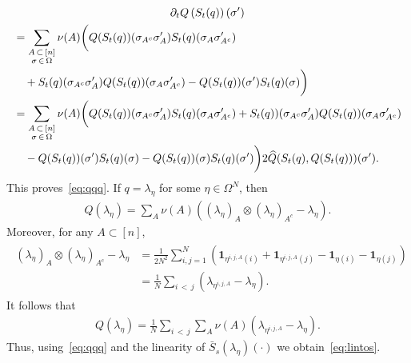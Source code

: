 \documentclass[AHL,Unicode,longabstracts,published]{cedram}
\newcommand{\Om}{\Omega}
\newcommand{\ind}{\mathbf{1}}
\let\l=\lambda
\let\O=\Omega
\let\oldhat\hat
\renewcommand*{\hat}[1]{\mathchoice{\widehat{#1}}{\widehat{#1}}{\oldhat{#1}}{\oldhat{#1}}}
\begin{document}
\begin{multline*}
\partial_t Q\left(S_t(q)\right)(\sigma')\\
\begin{aligned}
& = \sum_{\substack{A\,\subset\,[n]\\
\sigma\, \in\,\Om}}\nu(A)\bigg(Q(S_t(q))(\sigma_{A^c} \sigma'_{A}) S_t(q)(\sigma_A \sigma'_{A^c}) \\
&\quad +S_t(q)(\sigma_{A^c} \sigma'_{A})Q(S_t(q))(\sigma_A \sigma'_{A^c}) - Q(S_t(q))(\sigma')S_t(q)(\sigma)\bigg) \\
& = \sum_{\substack{A\,\subset\,[n] \\ \sigma \,\in\,\Om}}\nu(A)\bigg(Q(S_t(q))(\sigma_{A^c} \sigma'_{A}) S_t(q)(\sigma_A \sigma'_{A^c}) +S_t(q))(\sigma_{A^c} \sigma'_{A})Q(S_t(q))(\sigma_A \sigma'_{A^c}) \\
&\quad - Q(S_t(q))(\sigma')S_t(q)(\sigma)-Q(S_t(q))(\sigma)S_t(q)(\sigma')\bigg)
 2\hat{Q}(S_t(q),Q(S_t(q)))(\sigma').
\end{aligned} 
\end{multline*}
This proves~\eqref{eq:qqq}. If $q=\l_{\eta}$ for some $\eta\in\O^N$, then
\begin{align}
Q(\l_{\eta}) = \sum_A\nu(A) \left((\l_{\eta})_A\otimes(\l_{\eta})_{A^c} - \l_{\eta}\right).
\end{align}
Moreover, for any $A\subset [n]$,
\begin{align}
\begin{split}
(\l_{\eta})_A\otimes(\l_{\eta})_{A^c}- \l_{\eta}&= \frac1{2N^2} \sum_{i,j=1}^N\left(\ind_{\eta^{i,j,A}(i)} + \ind_{\eta^{i,j,A}(j)} - \ind_{\eta(i)} - \ind_{\eta(j)}\right)\\
&= \frac1{N} \sum_{i\,<\,j}\left(\l_{\eta^{i,j,A}} - \l_{\eta}\right).
\end{split}
\end{align}
It follows that
\begin{align}
Q(\l_{\eta}) = \frac1{N} \sum_{i\,<\,j}\sum_A\nu(A) (\l_{\eta^{i,j,A}} - \l_{\eta}).
\end{align}
Thus, using~\eqref{eq:qqq} and the linearity of $\bar S_s(\l_\eta)(\cdot)$ we obtain~\eqref{eq:lintos}.
\end{document}
